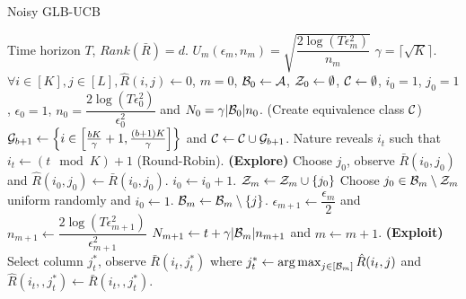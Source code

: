 \begin{algorithm}[!th]
\caption{Noisy GLB-UCB}
\label{alg:NGLB}
\begin{algorithmic}[1]
 Time horizon $T$, $Rank(\bar{R}) = d$.
 $U_m(\epsilon_m, n_m) = \sqrt{\dfrac{2\log(T\epsilon_m^2)}{n_m} }$
 $\gamma = \lceil\sqrt{K} \rceil$.
 $\forall i\in [K], j\in [L], \hat{R}(i,j) \leftarrow 0$, $m=0$, $\mathcal{B}_0 \leftarrow \mathcal{A}$, $\mathcal{Z}_0 \leftarrow \emptyset$, $\mathcal{C} \leftarrow \emptyset$,  $i_0=1$, $j_0=1$ , $\epsilon_0 = 1$, $n_0 = \dfrac{2\log(T\epsilon_{0}^2)}{\epsilon_{0}^2} $ and $N_0 = \gamma |\mathcal{B}_0|n_0$.
 (Create equivalence class $\mathcal{C}$)
\State  $\mathcal{G}_{b+1}\leftarrow \left\lbrace i\in \left[\frac{bK}{\gamma}+1,\frac{(b+1)K}{\gamma}\right]\right\rbrace$ and $\mathcal{C}\leftarrow \mathcal{C}\cup \mathcal{G}_{b+1}$.
\EndFor
{}	
\State Nature reveals $i_t$ such that $i_t \leftarrow (t \mod K) + 1$ (Round-Robin).
 \textbf{ (Explore) }
\State Choose $j_0$, observe $\bar{R}(i_0,j_0)$ and $\hat{R}(i_0,j_0)\leftarrow \bar{R}(i_0,j_0)$.
\State $i_0 \leftarrow i_0 + 1$.
\Else
\State $\mathcal{Z}_m \leftarrow \mathcal{Z}_m \cup \lbrace j_0\rbrace$
\State Choose $j_0\in\mathcal{B}_m\setminus \mathcal{Z}_m$ uniform randomly and $i_0 \leftarrow 1$.
\EndIf
\Else
\ColElim
\State {}
\State {}
\State $\mathcal{B}_m \leftarrow \mathcal{B}_m \setminus \lbrace j \rbrace$. 
\EndWhile
\EndFor
\EndColElim
\ResParam
\State $\epsilon_{m+1} \leftarrow \dfrac{\epsilon_m}{2}$ and $n_{m+1} \leftarrow \dfrac{2\log(T\epsilon_{m+1}^2)}{\epsilon_{m+1}^2}$
\State $N_{m+1} \leftarrow t + \gamma |\mathcal{B}_m|n_{m+1}$ and $m \leftarrow m + 1$.
\EndResParam
\EndIf
\Else \textbf{ (Exploit) }
\State  Select column $j_t^*$, observe $\bar{R}(i_t,j_t^*)$ where $j_t^* \leftarrow \mathop{\rm arg\,max}_{j\in[\mathcal{B}_m]} {\hat{R}(i_t,j)}$ and $\hat{R}(i_t,,j_t^*)\leftarrow \bar{R}(i_t,,j_t^*)$.
\EndIf
\EndFor
\end{algorithmic}
\end{algorithm}


